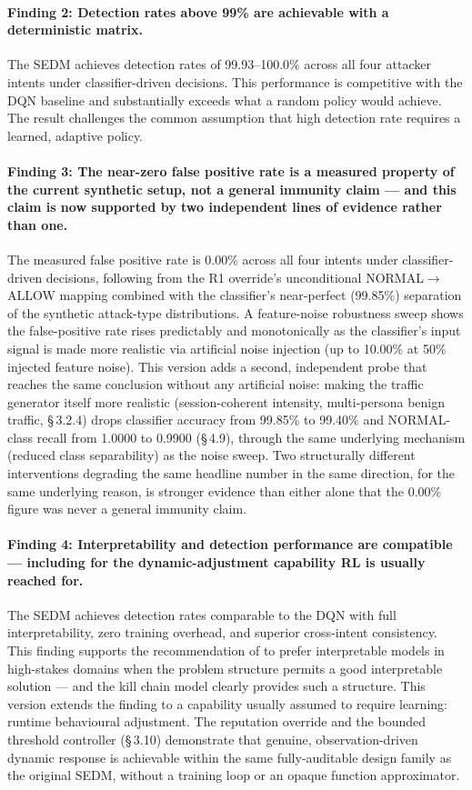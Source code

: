 \paragraph{Finding 2: Detection rates above 99\% are achievable with a deterministic matrix.}
The SEDM achieves detection rates of 99.93--100.0\% across all four attacker
intents under classifier-driven decisions.
This performance is competitive with the DQN baseline and substantially
exceeds what a random policy would achieve.
The result challenges the common assumption that high detection rate requires
a learned, adaptive policy.

\paragraph{Finding 3: The near-zero false positive rate is a measured property of the current synthetic setup, not a general immunity claim --- and this claim is now supported by two independent lines of evidence rather than one.}
The measured false positive rate is 0.00\% across all four intents under
classifier-driven decisions, following from the R1 override's unconditional
NORMAL$\to$ALLOW mapping combined with the classifier's near-perfect
(99.85\%) separation of the synthetic attack-type distributions.
A feature-noise robustness sweep shows the false-positive rate rises
predictably and monotonically as the classifier's input signal is made more
realistic via artificial noise injection (up to 10.00\% at 50\% injected
feature noise).
This version adds a second, independent probe that reaches the same
conclusion without any artificial noise: making the traffic generator itself
more realistic (session-coherent intensity, multi-persona benign traffic,
\S\,3.2.4) drops classifier accuracy from 99.85\% to 99.40\% and NORMAL-class
recall from 1.0000 to 0.9900 (\S\,4.9), through the same underlying mechanism
(reduced class separability) as the noise sweep.
Two structurally different interventions degrading the same headline number
in the same direction, for the same underlying reason, is stronger evidence
than either alone that the 0.00\% figure was never a general immunity claim.

\paragraph{Finding 4: Interpretability and detection performance are compatible --- including for the dynamic-adjustment capability RL is usually reached for.}
The SEDM achieves detection rates comparable to the DQN with full
interpretability, zero training overhead, and superior cross-intent
consistency.
This finding supports the recommendation of \citet{rudin2019stop} to prefer
interpretable models in high-stakes domains when the problem structure permits
a good interpretable solution --- and the kill chain model clearly provides
such a structure.
This version extends the finding to a capability usually assumed to require
learning: runtime behavioural adjustment.
The reputation override and the bounded threshold controller (\S\,3.10)
demonstrate that genuine, observation-driven dynamic response is achievable
within the same fully-auditable design family as the original SEDM, without a
training loop or an opaque function approximator.


